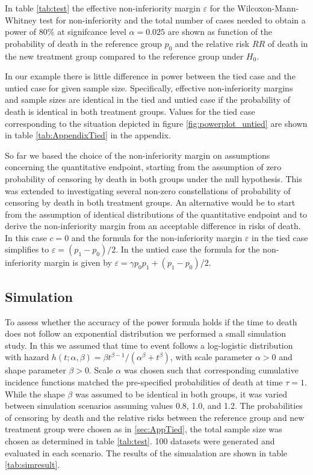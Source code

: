 \documentclass[bimj,fleqn]{w-art}\usepackage[]{graphicx}\usepackage[]{color}
\theoremstyle{plain}
\theoremstyle{definition}
\begin{document}
In table \ref{tab:test} the effective non-inferiority margin $\varepsilon$ for the
Wilcoxon-Mann-Whitney test for non-inferiority and the total number of cases
needed to obtain a power of 80\% at signifcance level $\alpha =0.025$ are
shown as function of the probability of death in the reference group $p_0$ and
the relative risk $RR$ of death in the new treatment group compared to the
reference group under $H_0$.

In our example there is little difference in power between the tied case
and the untied case for given sample size. Specifically, effective
non-inferiority margins and sample sizes are identical in the tied and untied
case if the probability of death is identical in both treatment groups. Values
for the tied case corresponding to the situation depicted in figure
\ref{fig:powerplot_untied} are shown in table \ref{tab:AppendixTied} in the
appendix.

So far we based the choice of the non-inferiority margin on assumptions
concerning the quantitative endpoint, starting from the assumption of zero
probability of censoring by death in both groups under the null hypothesis.
This was extended to investigating several non-zero constellations of probability
of censoring by death in both treatment groups. An alternative would be to start
from the assumption of identical distributions of the quantitative endpoint and
to derive the non-inferiority margin from an acceptable difference in risks of
death. In this case $c = 0$ and the formula for the non-inferiority margin
$\varepsilon$ in the tied case simplifies to $\varepsilon = (p_1 - p_0) / 2$.
In the untied case the formula for the non-inferiority margin is given by
$\varepsilon = \gamma p_0 p_1 + (p_1 - p_0) / 2$.


\subsection{Simulation}
\label{sec:Sim}


To assess whether the accuracy of the power formula holds if the time to
death does not follow an exponential distribution we performed a small simulation
study. In this we assumed that time to event follows a log-logistic distribution
with hazard $h(t; \alpha, \beta) = \beta t^{\beta - 1} / (\alpha^{\beta} + t^{\beta})$,
with scale parameter $\alpha > 0 $ and shape parameter $\beta > 0$. Scale $\alpha$ was
chosen such that corresponding cumulative incidence functions matched the
pre-specified probabilities of death at time $\tau = 1$. While the shape $\beta$
was assumed to be identical in both groups, it was varied between simulation
scenarios assuming values 0.8, 1.0, and 1.2.
The probabilities of censoring by death and the relative risks between the
reference group and new treatment group were chosen as in \ref{sec:AppTied}, the
total sample size was chosen as determined in table \ref{tab:test}. 100 datasets
were generated and evaluated in each scenario. The results of the simualation
are shown in table \ref{tab:simresult}.
\end{document}
